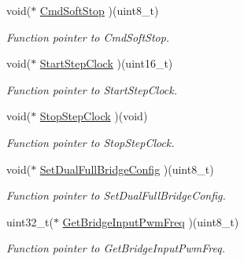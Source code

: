 \begin{DoxyCompactItemize}
\mbox{\label{structmotor_drv__t_ab5c6e9048c3334dc81cb7c6ac9625547}} 
void($\ast$ \mbox{\hyperlink{structmotor_drv__t_ab5c6e9048c3334dc81cb7c6ac9625547}{Cmd\+Soft\+Stop}} )(uint8\+\_\+t)
\begin{DoxyCompactList}\small\item\em Function pointer to Cmd\+Soft\+Stop. \end{DoxyCompactList}\item 
\mbox{\label{structmotor_drv__t_a6ac111117c8e432558c166dcdc876411}} 
void($\ast$ \mbox{\hyperlink{structmotor_drv__t_a6ac111117c8e432558c166dcdc876411}{Start\+Step\+Clock}} )(uint16\+\_\+t)
\begin{DoxyCompactList}\small\item\em Function pointer to Start\+Step\+Clock. \end{DoxyCompactList}\item 
\mbox{\label{structmotor_drv__t_a9e75bf31df238beafa7e4f11a36301ab}} 
void($\ast$ \mbox{\hyperlink{structmotor_drv__t_a9e75bf31df238beafa7e4f11a36301ab}{Stop\+Step\+Clock}} )(void)
\begin{DoxyCompactList}\small\item\em Function pointer to Stop\+Step\+Clock. \end{DoxyCompactList}\item 
\mbox{\label{structmotor_drv__t_a774a6230e5f80b27e642ea024ad33be7}} 
void($\ast$ \mbox{\hyperlink{structmotor_drv__t_a774a6230e5f80b27e642ea024ad33be7}{Set\+Dual\+Full\+Bridge\+Config}} )(uint8\+\_\+t)
\begin{DoxyCompactList}\small\item\em Function pointer to Set\+Dual\+Full\+Bridge\+Config. \end{DoxyCompactList}\item 
\mbox{\label{structmotor_drv__t_a8cec4a8fd6459ee5085fab5f1709e798}} 
uint32\+\_\+t($\ast$ \mbox{\hyperlink{structmotor_drv__t_a8cec4a8fd6459ee5085fab5f1709e798}{Get\+Bridge\+Input\+Pwm\+Freq}} )(uint8\+\_\+t)
\begin{DoxyCompactList}\small\item\em Function pointer to Get\+Bridge\+Input\+Pwm\+Freq. \end{DoxyCompactList}\item 

\end{DoxyCompactItemize}
